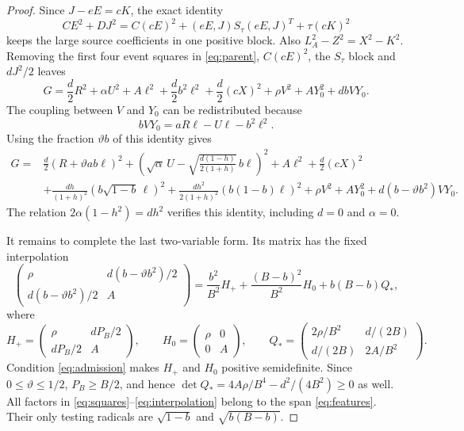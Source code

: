 \documentclass[10pt]{article}
\begin{document}
\begin{proof}
Since $J-eE=cK$, the exact identity
\[
 CE^2+DJ^2=C(cE)^2+(eE,J)S_\tau(eE,J)^T+\tau(cK)^2
\]
keeps the large source coefficients in one positive block. Also
$L_A^2-Z^2=X^2-K^2$. Removing the first four event squares in
\eqref{eq:parent}, $C(cE)^2$, the $S_\tau$ block and $dJ^2/2$ leaves
\begin{equation}
 G=\frac d2R^2+\alpha U^2+A\ell^2+\frac d2b^2\ell^2
       +\frac d2(cX)^2+\rho V^2+AY_0^2+dbVY_0.
 \label{eq:residual}
\end{equation}
The coupling between $V$ and $Y_0$ can be redistributed because
\begin{equation}
 bVY_0=aR\ell-U\ell-b^2\ell^2.              \label{eq:cancellation}
\end{equation}
Using the fraction $\vartheta b$ of this identity gives
\begin{align}
G={}&\frac d2(R+\vartheta ab\ell)^2
 +\left(\sqrt\alpha\,U-
       \sqrt{\frac{d(1-h)}{2(1+h)}}\,b\ell\right)^2
 +A\ell^2+\frac d2(cX)^2 \nonumber\\
 &+\frac{dh}{(1+h)^2}(b\sqrt{1-b}\,\ell)^2
 +\frac{dh^2}{2(1+h)^2}(b(1-b)\ell)^2
 +\rho V^2+AY_0^2+d(b-\vartheta b^2)VY_0. \label{eq:squares}
\end{align}
The relation $2\alpha(1-h^2)=dh^2$ verifies this identity,
including $d=0$ and $\alpha=0$.

It remains to complete the last two-variable form. Its matrix has the
fixed interpolation
\begin{equation}
 \begin{pmatrix}\rho&d(b-\vartheta b^2)/2\\
 d(b-\vartheta b^2)/2&A\end{pmatrix}
 =\frac{b^2}{B^2}H_+
  +\frac{(B-b)^2}{B^2}H_0+b(B-b)Q_*,
 \label{eq:interpolation}
\end{equation}
where
\[
 H_+=\begin{pmatrix}\rho&dP_B/2\\dP_B/2&A\end{pmatrix},
 \qquad H_0=\begin{pmatrix}\rho&0\\0&A\end{pmatrix},
 \qquad Q_*=\begin{pmatrix}2\rho/B^2&d/(2B)\\d/(2B)&2A/B^2\end{pmatrix}.
\]
Condition \eqref{eq:admission} makes $H_+$ and $H_0$ positive
semidefinite. Since $0\leq\vartheta\leq1/2$, $P_B\geq B/2$, and hence
$\det Q_*=4A\rho/B^4-d^2/(4B^2)\geq0$ as well.
All factors in \eqref{eq:squares}--\eqref{eq:interpolation} belong to
the span \eqref{eq:features}. Their only testing radicals are
$\sqrt{1-b}$ and $\sqrt{b(B-b)}$.


\end{proof}
\end{document}
